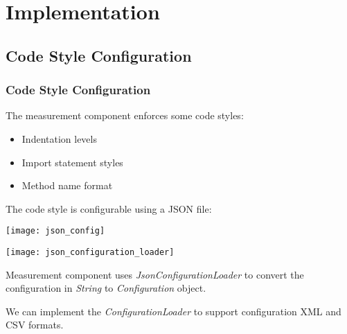 \section{Implementation}

\subsection{Code Style Configuration}
\begin{frame}[allowframebreaks]
\frametitle{Code Style Configuration}

The measurement component enforces some code styles:

\begin{itemize}
  \item Indentation levels
  \item Import statement styles
  \item Method name format
\end{itemize}

The code style is configurable using a JSON file:

\texttt{[image: json\_config]}

\framebreak

\texttt{[image: json\_configuration\_loader]}

Measurement component uses \textit{JsonConfigurationLoader} to convert the configuration in \textit{String} to \textit{Configuration} object.

We can implement the \textit{ConfigurationLoader} to support configuration XML and CSV formats.
\end{frame}

